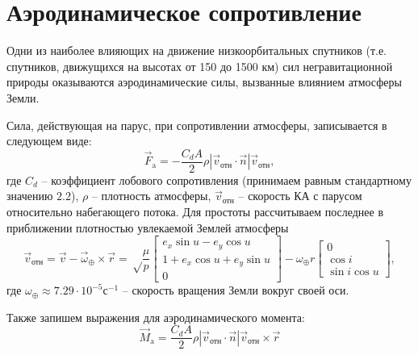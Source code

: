 \section{Аэродинамическое сопротивление}
\noindent\indent Одни из наиболее влияющих на движение низкоорбитальных спутников
(т.е. спутников, движущихся на высотах от 150 до 1500 км) сил негравитационной
природы оказываются аэродинамические силы, вызванные влиянием атмосферы Земли.\par
    Сила, действующая на парус, при сопротивлении атмосферы, записывается в
следующем виде:
\begin{equation}
    \vec{F}_{\text{a}} = -\frac{C_d A}{2}\rho|\vec{v}_{\text{отн}} \cdot \vec{n}| \vec{v}_{\text{отн}},
\end{equation}
где $C_d$ -- коэффициент лобового сопротивления (принимаем равным стандартному
значению $2.2$), $\rho$ -- плотность атмосферы, $\vec{v}_{\text{отн}}$ --
скорость КА с парусом относительно набегающего потока. Для простоты рассчитываем
последнее в приближении плотностью увлекаемой Землей атмосферы
\begin{equation}
    \vec{v}_{\text{отн}} = \vec{v} - \vec{\omega}_{\oplus} \times \vec{r} =
\sqrt\frac{\mu}{p}\begin{bmatrix}
           e_x\sin u - e_y\cos u \\
           1 + e_x\cos u + e_y\sin u \\
           0
         \end{bmatrix} - \omega_{\oplus}r\begin{bmatrix}
                    0 \\
                    \cos i \\
                    \sin i \cos u
                  \end{bmatrix},
\end{equation}
где $\omega_{\oplus} \approx 7.29\cdot 10^{-5} \text{с}^{-1}$ -- скорость вращения
Земли вокруг своей оси.\par
    Также запишем выражения для аэродинамического момента:
\begin{equation}
    \vec{M}_{\text{a}} = \frac{C_d A}{2}\rho|\vec{v}_{\text{отн}} \cdot \vec{n}| \vec{v}_{\text{отн}}\times\vec{r}
\end{equation}

